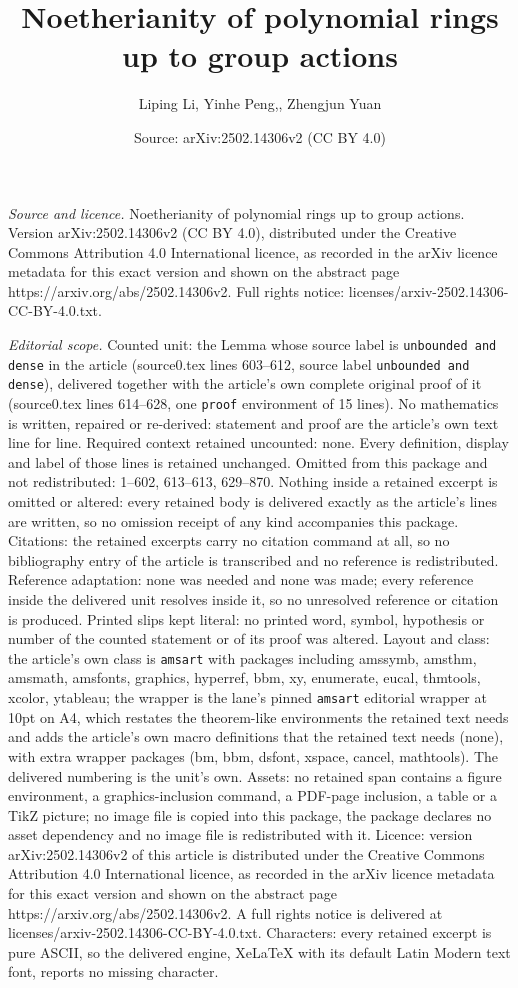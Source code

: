\documentclass[10pt,a4paper]{amsart}
\title[Noetherianity of polynomial rings up to group actions]{Noetherianity of polynomial rings up to group actions}
\author{Liping Li, Yinhe Peng,, Zhengjun Yuan}
\date{Source: arXiv:2502.14306v2 (CC BY 4.0)}
\begin{document}
\maketitle

\noindent\emph{Source and licence.} Noetherianity of polynomial rings up to group actions. Version arXiv:2502.14306v2 (CC BY 4.0), distributed under the Creative Commons Attribution 4.0 International licence, as recorded in the arXiv licence metadata for this exact version and shown on the abstract page https://arxiv.org/abs/2502.14306v2. Full rights notice: licenses/arxiv-2502.14306-CC-BY-4.0.txt.\par\smallskip

\noindent\textit{Editorial scope.} Counted unit: the Lemma whose source label is \texttt{unbounded and dense} in the article (source0.tex lines 603--612, source label \texttt{unbounded and dense}), delivered together with the article's own complete original proof of it (source0.tex lines 614--628, one \texttt{proof} environment of 15 lines). No mathematics is written, repaired or re-derived: statement and proof are the article's own text line for line. Required context retained uncounted: none. Every definition, display and label of those lines is retained unchanged. Omitted from this package and not redistributed: 1--602, 613--613, 629--870. Nothing inside a retained excerpt is omitted or altered: every retained body is delivered exactly as the article's lines are written, so no omission receipt of any kind accompanies this package. Citations: the retained excerpts carry no citation command at all, so no bibliography entry of the article is transcribed and no reference is redistributed. Reference adaptation: none was needed and none was made; every reference inside the delivered unit resolves inside it, so no unresolved reference or citation is produced. Printed slips kept literal: no printed word, symbol, hypothesis or number of the counted statement or of its proof was altered. Layout and class: the article's own class is \texttt{amsart} with packages including amssymb, amsthm, amsmath, amsfonts, graphics, hyperref, bbm, xy, enumerate, eucal, thmtools, xcolor, ytableau; the wrapper is the lane's pinned \texttt{amsart} editorial wrapper at 10pt on A4, which restates the theorem-like environments the retained text needs and adds the article's own macro definitions that the retained text needs (none), with extra wrapper packages (bm, bbm, dsfont, xspace, cancel, mathtools). The delivered numbering is the unit's own. Assets: no retained span contains a figure environment, a graphics-inclusion command, a PDF-page inclusion, a table or a TikZ picture; no image file is copied into this package, the package declares no asset dependency and no image file is redistributed with it. Licence: version arXiv:2502.14306v2 of this article is distributed under the Creative Commons Attribution 4.0 International licence, as recorded in the arXiv licence metadata for this exact version and shown on the abstract page https://arxiv.org/abs/2502.14306v2. A full rights notice is delivered at licenses/arxiv-2502.14306-CC-BY-4.0.txt. Characters: every retained excerpt is pure ASCII, so the delivered engine, XeLaTeX with its default Latin Modern text font, reports no missing character.
\end{document}
